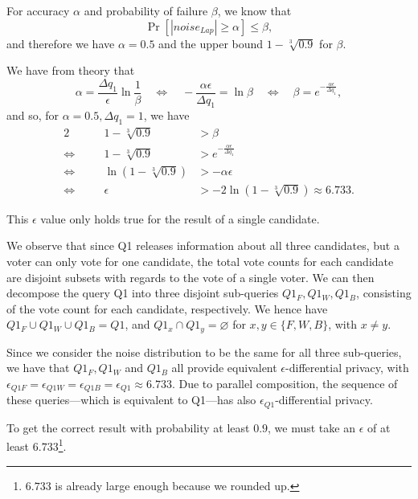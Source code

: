 \documentclass[parskip=half]{scrartcl}
\begin{document}
\begin{enumerate}
    For accuracy $\alpha$ and probability of failure $\beta$, we know that
    $$
        \Pr[|\textit{noise}_\textit{Lap}| \ge \alpha] \le \beta,
    $$
    and therefore we have $\alpha = 0.5$ and the upper bound
    $1 - \sqrt[3]{0.9}$ for $\beta$\footnotemark{}.


    We have from theory that
    $$
        \alpha = \frac{\Delta q_1}{\epsilon}\ln{\frac{1}{\beta}}
        \quad\Leftrightarrow\quad
        -\frac{\alpha\epsilon}{\Delta q_1} = \ln{\beta}
        \quad\Leftrightarrow\quad
        \beta = e^{-\frac{\alpha\epsilon}{\Delta q_1}},
    $$
    and so, for $\alpha = 0.5, \Delta q_1 = 1$, we have 
    \begin{alignat*}{2}
        \quad &&
            1 - \sqrt[3]{0.9} &> \beta\\
        \Leftrightarrow\quad &&
            1 - \sqrt[3]{0.9} &> e^{-\frac{\alpha\epsilon}{\Delta q_1}}\\
        \Leftrightarrow\quad &&
            \ln{\left(1 - \sqrt[3]{0.9}\right)} &> -\alpha\epsilon\\
        \Leftrightarrow\quad &&
            \epsilon &> -2 \ln{\left(1 - \sqrt[3]{0.9}\right)} \approx 6.733.
    \end{alignat*}

    This $\epsilon$ value only holds true for the result of a single candidate.
    
    We observe that since Q1 releases information about all three candidates,
    but a voter can only vote for one candidate, the total vote counts for each
    candidate are disjoint subsets with regards to the vote of a single voter.
    We can then decompose the query Q1 into three disjoint sub-queries
    $Q1_F, Q1_W, Q1_B$, consisting of the vote count for each candidate,
    respectively. We hence have $Q1_F \cup Q1_W \cup Q1_B = Q1$, and
    $Q1_x \cap Q1_y = \varnothing$ for $x, y\in \{F, W, B\}$, with $x\neq y$.

    Since we consider the noise distribution to be the same for all three
    sub-queries, we have that $Q1_F, Q1_W$ and $Q1_B$ all provide equivalent
    $\epsilon$-differential privacy, with $\epsilon_{\textit{Q1F}} =
    \epsilon_\textit{Q1W} = \epsilon_\textit{Q1B} = \epsilon_{\textit{Q1}}
    \approx 6.733$. Due to parallel composition, the sequence of these
    queries---which is equivalent to Q1---has also
    $\epsilon_{\textit{Q1}}$-differential privacy.

    To get the correct result with probability at least $0.9$, we must take an
    $\epsilon$ of at least $6.733$\footnote{$6.733$ is already large enough
    because we rounded up.}.
\end{enumerate}
\end{document}
